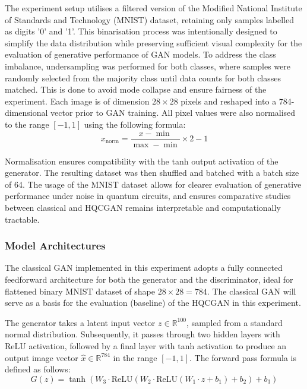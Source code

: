 \documentclass[conference]{IEEEtran}
\begin{document}
The experiment setup utilises a filtered version of the Modified National Institute of Standards and Technology (MNIST) dataset, retaining only samples labelled as digits '0' and '1'. This binarisation process was intentionally designed to simplify the data distribution while preserving sufficient visual complexity for the evaluation of generative performance of GAN models. To address the class imbalance, undersampling was performed for both classes, where samples were randomly selected from the majority class until data counts for both classes matched. This is done to avoid mode collapse and ensure fairness of the experiment. Each image is of dimension $28 \times 28$ pixels and reshaped into a 784-dimensional vector prior to GAN training. All pixel values were also normalised to the range $[-1, 1]$ using the following formula:
\begin{equation}
x_{\text{norm}} = \frac{x - \min}{\max - \min} \times 2 - 1
\end{equation}

Normalisation ensures compatibility with the tanh output activation of the generator. The resulting dataset was then shuffled and batched with a batch size of 64. The usage of the MNIST dataset allows for clearer evaluation of generative performance under noise in quantum circuits, and ensures comparative studies between classical and HQCGAN remains interpretable and computationally tractable.

\subsubsection{Model Architectures}
The classical GAN implemented in this experiment adopts a fully connected feedforward architecture for both the generator and the discriminator, ideal for flattened binary MNIST dataset of shape $28 \times 28 = 784$. The classical GAN will serve as a basis for the evaluation (baseline) of the HQCGAN in this experiment.

The generator takes a latent input vector \( z \in \mathbb{R}^{100} \), sampled from a standard normal distribution. Subsequently, it passes through two hidden layers with ReLU activation, followed by a final layer with tanh activation to produce an output image vector \( \hat{x} \in \mathbb{R}^{784} \) in the range $[-1, 1]$. The forward pass formula is defined as follows:
\begin{equation}
G(z) = \tanh(W_3 \cdot \text{ReLU}(W_2 \cdot \text{ReLU}(W_1 \cdot z + b_1) + b_2) + b_3)
\end{equation}
\end{document}
